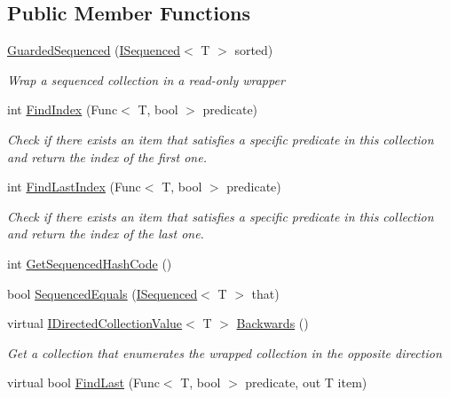 \subsection*{Public Member Functions}
\begin{DoxyCompactItemize}
\item 
\hyperlink{class_c5_1_1_guarded_sequenced_ac95669006745b3cbd6499f705e943df9}{Guarded\+Sequenced} (\hyperlink{interface_c5_1_1_i_sequenced}{I\+Sequenced}$<$ T $>$ sorted)
\begin{DoxyCompactList}\small\item\em Wrap a sequenced collection in a read-\/only wrapper \end{DoxyCompactList}\item 
int \hyperlink{class_c5_1_1_guarded_sequenced_a610348d7c60a714f948a763ab5afc60d}{Find\+Index} (Func$<$ T, bool $>$ predicate)
\begin{DoxyCompactList}\small\item\em Check if there exists an item that satisfies a specific predicate in this collection and return the index of the first one. \end{DoxyCompactList}\item 
int \hyperlink{class_c5_1_1_guarded_sequenced_ad06df0c721132964b3f91c761232f74f}{Find\+Last\+Index} (Func$<$ T, bool $>$ predicate)
\begin{DoxyCompactList}\small\item\em Check if there exists an item that satisfies a specific predicate in this collection and return the index of the last one. \end{DoxyCompactList}\item 
int \hyperlink{class_c5_1_1_guarded_sequenced_a04214406cd7fe4814643b79c5005c799}{Get\+Sequenced\+Hash\+Code} ()
\item 
bool \hyperlink{class_c5_1_1_guarded_sequenced_ac4377e7ad77d3954865ad6500fb47245}{Sequenced\+Equals} (\hyperlink{interface_c5_1_1_i_sequenced}{I\+Sequenced}$<$ T $>$ that)
\item 
virtual \hyperlink{interface_c5_1_1_i_directed_collection_value}{I\+Directed\+Collection\+Value}$<$ T $>$ \hyperlink{class_c5_1_1_guarded_sequenced_a5bbddf444037001d526931116e6b16e7}{Backwards} ()
\begin{DoxyCompactList}\small\item\em Get a collection that enumerates the wrapped collection in the opposite direction \end{DoxyCompactList}\item 
virtual bool \hyperlink{class_c5_1_1_guarded_sequenced_a4741f8cd5c5fa8fb3d6b7a71268cdefb}{Find\+Last} (Func$<$ T, bool $>$ predicate, out T item)
\end{DoxyCompactItemize}
